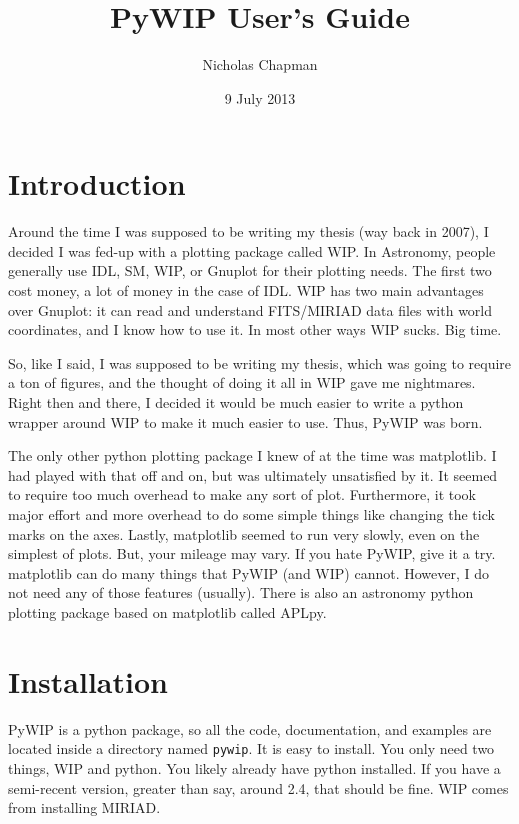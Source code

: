 \documentclass[12pt]{article}
\title{PyWIP User's Guide}
\author{Nicholas Chapman}
\date{9 July 2013}
\newcommand{\pywip}{PyWIP}
\begin{document}
\maketitle
\tableofcontents
\newpage

\section{Introduction}

Around the time I was supposed to be writing my thesis (way back in 2007), I
decided I was fed-up with a plotting package called WIP.  In Astronomy, people
generally use IDL, SM, WIP, or Gnuplot for their plotting needs.  The first two
cost money, a lot of money in the case of IDL.  WIP has two main advantages over
Gnuplot: it can read and understand FITS/MIRIAD data files with world
coordinates, and I know how to use it.  In most other ways WIP sucks.  Big time.

So, like I said, I was supposed to be writing my thesis, which was going to
require a ton of figures, and the thought of doing it all in WIP gave me
nightmares.  Right then and there, I decided it would be much easier to write
a python wrapper around WIP to make it much easier to use.  Thus, \pywip{} was
born.

The only other python plotting package I knew of at the time was matplotlib.  I
had played with that off and on, but was ultimately unsatisfied by it.  It
seemed to require too much overhead to make any sort of plot.  Furthermore, it
took major effort and more overhead to do some simple things like changing the
tick marks on the axes.  Lastly, matplotlib seemed to run very slowly, even on
the simplest of plots.  But, your mileage may vary.  If you hate \pywip{}, give
it a try. matplotlib can do many things that \pywip{} (and WIP) cannot. 
However, I do not need any of those features (usually).  There is also an
astronomy python plotting package based on matplotlib called APLpy.

\section{Installation}

\pywip{} is a python package, so all the code, documentation, and examples are
located inside a directory named \texttt{pywip}.  It is easy to install. You
only need two things, WIP and python.  You likely already have python
installed.  If you have a semi-recent version, greater than say, around 2.4,
that should be fine.  WIP comes from installing MIRIAD.
\end{document}
